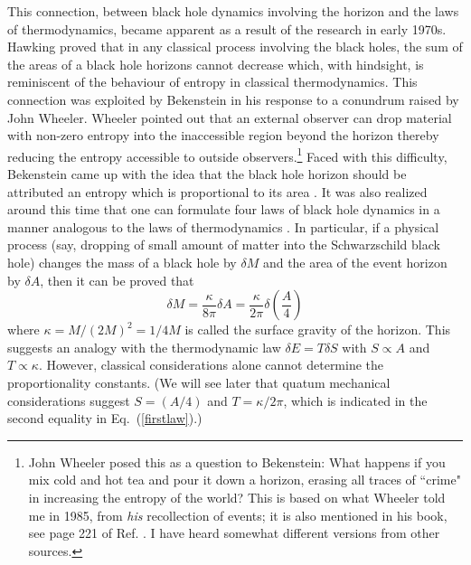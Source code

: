 \documentclass[12pt]{iopart}
\def\eq#1{{Eq.~(\ref{#1})}}
\begin{document}
This connection, between black hole dynamics involving the horizon and the laws of thermodynamics, became apparent as  a result of the research  in early 1970s.
Hawking proved \cite{areatheorem} that in any classical process involving the black holes, 
the sum of the areas of a black hole horizons cannot decrease which, with hindsight, is reminiscent of the behaviour of entropy in classical thermodynamics. This connection was exploited by Bekenstein in his response to a  conundrum raised by John Wheeler.
Wheeler pointed out  that  an external observer can drop material with non-zero entropy into the inaccessible region beyond the horizon thereby reducing the entropy accessible to outside observers.\footnote{John Wheeler posed this as a question to Bekenstein:  What happens if you mix cold and hot tea and pour it down a horizon, erasing all traces of ``crime" in increasing the entropy of the world? This is based on what Wheeler told me in 1985, from \textit{his} recollection of events; it is also mentioned in his book, see page 221 of Ref. \cite{wheeler}.
 I have heard somewhat different versions from other sources.}
Faced with this difficulty, Bekenstein came up with the idea that the black hole horizon should be attributed an entropy which is proportional to its area \cite{Bekenstein:1972tm,Bekenstein:1973ur,Bekenstein:1974ax}. 
It was also realized around this time that one can formulate four laws of black hole dynamics in a manner analogous to the laws of thermodynamics \cite{Bardeen:1973gs}. In particular, if a physical process (say, dropping of small amount of matter into the Schwarzschild black hole) changes the mass of a black hole by $\delta M$ and the area of the event horizon by
$\delta A$, then it can be proved that
\begin{equation}
 \delta M = \frac{\kappa}{8\pi} \delta A = \frac{\kappa}{2\pi}\delta\left(\frac{A}{4}\right)
 \label{firstlaw}
\end{equation} 
where $\kappa = M/(2M)^2 = 1/4M$ is called the surface gravity of the horizon.
This suggests an analogy with the thermodynamic law $\delta E = T \delta S$ with 
$S\propto A$ and $T\propto \kappa$.  However, classical considerations alone cannot determine the proportionality constants. (We will see later that quatum mechanical considerations suggest $S=(A/4)$ and
$T=\kappa/2\pi$, which is indicated in the second equality in \eq{firstlaw}.) 
\end{document}
